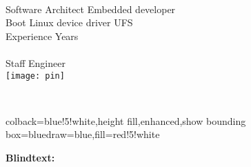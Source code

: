 \documentclass[a4paper]{chirri} %
\newcommand*{\localLocPin}{%
  \texttt{[image: pin]}%
}
\begin{document}
\layout                    %

\begin{headingbox}[skin=bicolor,colbacklower=yellow,lower separated=true]
   \UserName{} \\
   Software Architect \textbullet Embedded developer \\
   \textbullet Boot \textbullet Linux device driver \textbullet UFS  \\
   Experience \UserExperience{} Years    \\
   \faPhone{} \UserMobile{} \textbullet \space \faEnvelope{} \space \UserEmailID{}
%
%
\tcblower
   \CurrentCompany{} \\
   Staff Engineer  \\
   {\Large{\localLocPin}}{} \UserLocation{}
%
%
\end{headingbox}
\\[0.25\baselineskip]

\begin{masterbox}{colback=blue!5!white,height fill,enhanced,show bounding box=blue}{draw=blue,fill=red!5!white}

\end{masterbox}

\lipsum[1-3]
\textbf{Blindtext:}
\Blindtext
\end{document}
